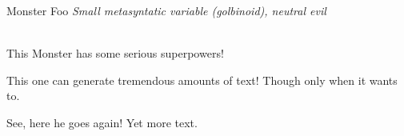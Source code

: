 \begin{monsterbox}{Monster Foo}
	\textit{Small metasyntatic variable (golbinoid), neutral evil}\\
	\hline
	\basics[%
	armorclass = 12,
	hitpoints  = 16 (3d8 + 3),
	speed      = 50 ft
	]
	\hline
	\stats[
    STR = \stat{12}, %
    DEX = \stat{7}
	]
	\hline
	\details[%
	languages = {Common Lisp, Erlang},
	]
	\hline \\[1mm]
	\begin{monsteraction}
		This Monster has some serious superpowers!
	\end{monsteraction}
	\begin{monsteraction}
		This one can generate tremendous amounts of text! Though only when it wants to.
	\end{monsteraction}

	\begin{monsteraction}
    See, here he goes again! Yet more text.
	\end{monsteraction}
\end{monsterbox}
